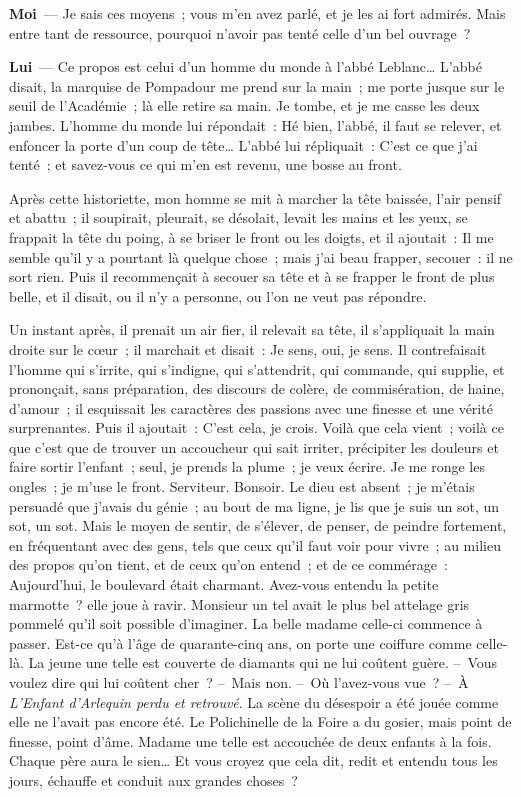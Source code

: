 \documentclass[french,twoside]{book} %
\newcommand{\labelchar}[1]{\textbf{\color{rubric} #1}}
\begin{document}
\labelchar{Moi} — Je sais ces moyens ; vous m’en avez parlé, et je les ai fort admirés. Mais entre tant de ressource, pourquoi n’avoir pas tenté celle d’un bel ouvrage ?\par
\labelchar{Lui} — Ce propos est celui d’un homme du monde à l’abbé Leblanc… L’abbé disait, la marquise de Pompadour me prend sur la main ; me porte jusque sur le seuil de l’Académie ; là elle retire sa main. Je tombe, et je me casse les deux jambes. L’homme du monde lui répondait : Hé bien, l’abbé, il faut se relever, et enfoncer la porte d’un coup de tête… L’abbé lui répliquait : C’est ce que j’ai tenté ; et savez-vous ce qui m’en est revenu, une bosse au front.\par
Après cette historiette, mon homme se mit à marcher la tête baissée, l’air pensif et abattu ; il soupirait, pleurait, se désolait, levait les mains et les yeux, se frappait la tête du poing, à se briser le front ou les doigts, et il ajoutait : Il me semble qu’il y a pourtant là quelque chose ; mais j’ai beau frapper, secouer : il ne sort rien. Puis il recommençait à secouer sa tête et à se frapper le front de plus belle, et il disait, ou il n’y a personne, ou l’on ne veut pas répondre.\par
Un instant après, il prenait un air fier, il relevait sa tête, il s’appliquait la main droite sur le cœur ; il marchait et disait : Je sens, oui, je sens. Il contrefaisait l’homme qui s’irrite, qui s’indigne, qui s’attendrit, qui commande, qui supplie, et prononçait, sans préparation, des discours de colère, de commisération, de haine, d’amour ; il esquissait les caractères des passions avec une finesse et une vérité surprenantes. Puis il ajoutait : C’est cela, je crois. Voilà que cela vient ; voilà ce que c’est que de trouver un accoucheur qui sait irriter, précipiter les douleurs et faire sortir l’enfant ; seul, je prends la plume ; je veux écrire. Je me ronge les ongles ; je m’use le front. Serviteur. Bonsoir. Le dieu est absent ; je m’étais persuadé que j’avais du génie ; au bout de ma ligne, je lis que je suis un sot, un sot, un sot. Mais le moyen de sentir, de s’élever, de penser, de peindre fortement, en fréquentant avec des gens, tels que ceux qu’il faut voir pour vivre ; au milieu des propos qu’on tient, et de ceux qu’on entend ; et de ce commérage : Aujourd’hui, le boulevard était charmant. Avez-vous entendu la petite marmotte ? elle joue à ravir. Monsieur un tel avait le plus bel attelage gris pommelé qu’il soit possible d’imaginer. La belle madame celle-ci commence à passer. Est-ce qu’à l’âge de quarante-cinq ans, on porte une coiffure comme celle-là. La jeune une telle est couverte de diamants qui ne lui coûtent guère. – Vous voulez dire qui lui coûtent cher ? – Mais non. – Où l’avez-vous vue ? – À \emph{L’Enfant d’Arlequin perdu et retrouvé}. La scène du désespoir a été jouée comme elle ne l’avait pas encore été. Le Polichinelle de la Foire a du gosier, mais point de finesse, point d’âme. Madame une telle est accouchée de deux enfants à la fois. Chaque père aura le sien… Et vous croyez que cela dit, redit et entendu tous les jours, échauffe et conduit aux grandes choses ?\par
\end{document}
